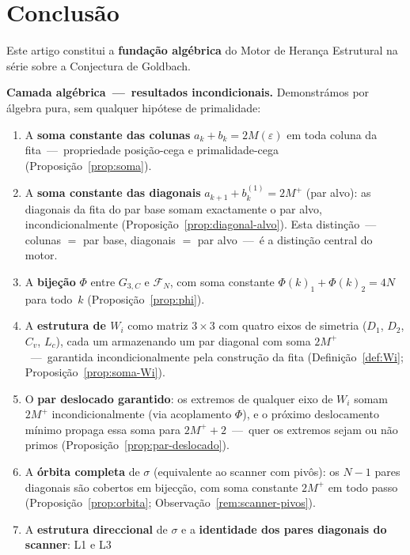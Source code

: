 \documentclass[12pt, a4paper]{article}
\theoremstyle{plain}
\theoremstyle{definition}
\theoremstyle{remark}
\begin{document}
	\section{Conclusão}
	\label{sec:conclusao}
	
	Este artigo constitui a \textbf{fundação algébrica} do Motor de
	Herança Estrutural na série sobre a Conjectura de Goldbach.
	
	\medskip
	\noindent\textbf{Camada algébrica~---~resultados incondicionais.}
	Demonstrámos por álgebra pura, sem qualquer hipótese de primalidade:
	\begin{enumerate}
		\item A \textbf{soma constante das colunas}
		$a_k+b_k=2M(\varepsilon)$ em toda coluna da fita~---~propriedade
		posição-cega e primalidade-cega (Proposição~\ref{prop:soma}).
		\item A \textbf{soma constante das diagonais}
		$a_{k+1}+b_k^{(1)}=2M^+$ (par alvo): as diagonais da fita do
		par base somam exactamente o par alvo, incondicionalmente
		(Proposição~\ref{prop:diagonal-alvo}).  Esta distinção~---~
		colunas $=$ par base, diagonais $=$ par alvo~---~é a distinção
		central do motor.
		\item A \textbf{bijeção} $\Phi$ entre $G_{3,C}$ e
		$\mathcal{F}_N$, com soma constante $\Phi(k)_1+\Phi(k)_2
		=4N$ para todo~$k$ (Proposição~\ref{prop:phi}).
		\item A \textbf{estrutura de $W_i$} como matriz $3\times3$ com
		quatro eixos de simetria ($D_1$, $D_2$, $C_v$, $L_c$), cada um
		armazenando um par diagonal com soma $2M^+$~---~garantida
		incondicionalmente pela construção da fita
		(Definição~\ref{def:Wi}; Proposição~\ref{prop:soma-Wi}).
		\item O \textbf{par deslocado garantido}: os extremos de qualquer
		eixo de $W_i$ somam $2M^+$ incondicionalmente (via acoplamento
		$\Phi$), e o próximo deslocamento mínimo propaga essa soma para
		$2M^++2$~---~quer os extremos sejam ou não primos
		(Proposição~\ref{prop:par-deslocado}).
		\item A \textbf{órbita completa} de $\sigma$ (equivalente ao
		scanner com pivôs): os $N-1$ pares diagonais são cobertos em
		bijecção, com soma constante $2M^+$ em todo passo
		(Proposição~\ref{prop:orbita}; Observação~\ref{rem:scanner-pivos}).
		\item A \textbf{estrutura direccional} de $\sigma$ e a
		\textbf{identidade dos pares diagonais do scanner}: L1 e L3

\end{enumerate}
\end{document}
